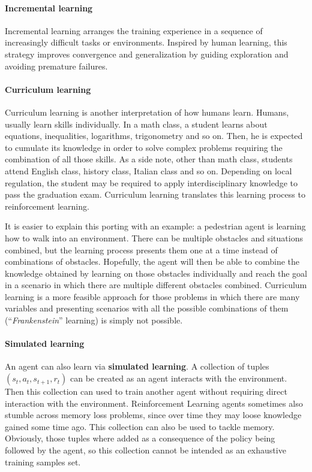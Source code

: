\paragraph{Incremental learning}

Incremental learning arranges the training experience in a sequence of increasingly difficult tasks or environments.
Inspired by human learning, this strategy improves convergence and generalization by guiding exploration and avoiding premature failures.

\paragraph{Curriculum learning}

Curriculum learning is another interpretation of how humans learn.
Humans, usually learn skills individually. In a math class, a student learns about equations, inequalities, logarithms, trigonometry and so on. Then, he is expected to cumulate its knowledge in order to solve complex problems requiring the combination of all those skills. As a side note, other than math class, students attend English class, history class, Italian class and so on. Depending on local regulation, the student may be required to apply interdisciplinary knowledge to pass the graduation exam.
Curriculum learning translates this learning process to reinforcement learning.

It is easier to explain this porting with an example: a pedestrian agent is learning how to walk into an environment.
There can be multiple obstacles and situations combined, but the learning process presents them one at a time instead of combinations of obstacles.
Hopefully, the agent will then be able to combine the knowledge obtained by learning on those obstacles individually and reach the goal in a scenario in which there are multiple different obstacles combined.
Curriculum learning is a more feasible approach for those problems in which there are many variables and presenting scenarios with all the possible combinations of them (``\textit{Frankenstein}'' learning) is simply not possible.

\paragraph{Simulated learning}

An agent can also learn via \textbf{simulated learning}.
A collection of tuples $(s_t, a_t, s_{t+1}, r_t)$ can be created as an agent interacts with the environment.
Then this collection can used to train another agent without requiring direct interaction with the environment.
Reinforcement Learning agents sometimes also stumble across memory loss problems, since over time they may loose knowledge gained some time ago.
This collection can also be used to tackle memory.
Obviously, those tuples where added as a consequence of the policy being followed by the agent, so this collection cannot be intended as an exhaustive training samples set.
